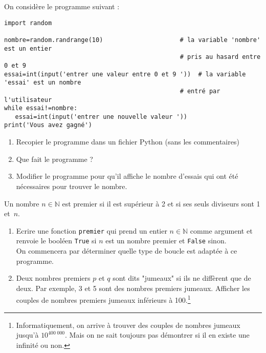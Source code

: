 \begin{exercice}
On considère le programme suivant : 
\begin{verbatim}
import random

nombre=random.randrange(10)                     # la variable 'nombre' est un entier 
                                                # pris au hasard entre 0 et 9
essai=int(input('entrer une valeur entre 0 et 9 '))  # la variable 'essai' est un nombre 
                                                # entré par l'utilisateur
while essai!=nombre:
   essai=int(input('entrer une nouvelle valeur '))
print('Vous avez gagné')	
\end{verbatim}
\begin{enumerate}
\item Recopier le programme dans un fichier Python (sans les commentaires)
\item Que fait le programme ?
\item Modifier le programme pour qu'il affiche le nombre d'essais qui ont été nécessaires pour trouver le nombre.
\end{enumerate}
\end{exercice}
\bigskip


\begin{exercice}
Un nombre $n\in\mathbb{N}$ est premier si il est supérieur à 2 et si ses seuls diviseurs sont 1 et~$n$.
\begin{enumerate}
\item Ecrire une fonction \verb?premier? qui prend un entier $n\in\mathbb{N}$ comme argument et renvoie le booléen \verb?True? si $n$ est un nombre premier et \verb?False? sinon.\\
On commencera par déterminer quelle type de boucle est adaptée à ce programme.
\item Deux nombres premiers $p$ et $q$ sont dits "jumeaux" si ils ne diffèrent que de deux. Par exemple, 3 et 5 sont des nombres premiers jumeaux. Afficher les couples de nombres premiers jumeaux inférieurs à 100.\footnote{Informatiquement, on arrive à trouver des couples de nombres jumeaux jusqu'à $10^{400\;000}$. Mais on ne sait toujours pas démontrer si il en existe une infinité ou non.}
\end{enumerate}
\end{exercice}
\bigskip



